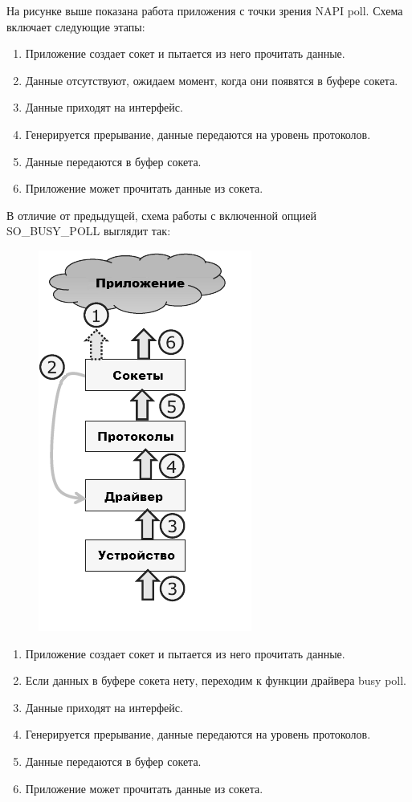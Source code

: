 \documentclass[10pt, a5paper]{article}
\begin{document}
На рисунке выше показана работа приложения с точки зрения \linebreak NAPI poll. Схема включает следующие этапы:

\begin{enumerate}
  \item Приложение создает сокет и пытается из него прочитать данные.
  \item Данные отсутствуют, ожидаем момент, когда они появятся в буфере сокета.
  \item Данные приходят на интерфейс.
  \item Генерируется прерывание, данные передаются на уровень протоколов.
  \item Данные передаются в буфер сокета.
  \item Приложение может прочитать данные из сокета.
\end{enumerate}

В отличие от предыдущей, схема работы с включенной опцией SO\_BUSY\_POLL выглядит так:

\begin{figure}[h!]
  \centering 
  \includegraphics[scale=0.6]{15_2015_classic-packet-path-with-busy-poll-ru}
\end{figure}


\begin{enumerate}
  \item Приложение создает сокет и пытается из него прочитать данные.
  \item Если данных в буфере сокета нету, переходим к функции драйвера busy poll.
  \item Данные приходят на интерфейс.
  \item Генерируется прерывание, данные передаются на уровень протоколов.
  \item Данные передаются в буфер сокета.
  \item Приложение может прочитать данные из сокета.
\end{enumerate}
\end{document}
